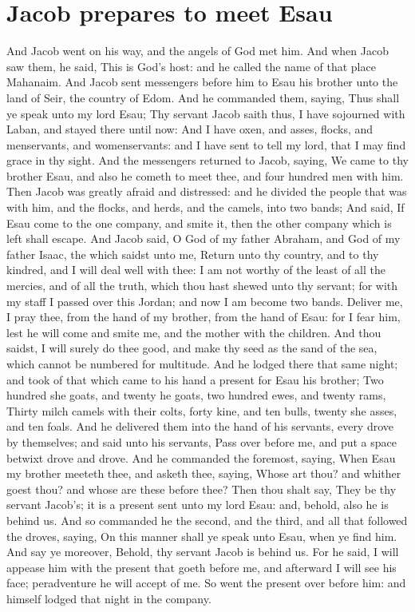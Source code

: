 \section*{Jacob prepares to meet Esau}
\begin{biblechapter} %
\verse And Jacob went on his way, and the angels of God met him.
\verse And when Jacob saw them, he said, This is God's host: and he called the name of that place Mahanaim.
\verse And Jacob sent messengers before him to Esau his brother unto the land of Seir, the country of Edom.
\verse And he commanded them, saying, Thus shall ye speak unto my lord Esau; Thy servant Jacob saith thus, I have sojourned with Laban, and stayed there until now:
\verse And I have oxen, and asses, flocks, and menservants, and womenservants: and I have sent to tell my lord, that I may find grace in thy sight.
\verse And the messengers returned to Jacob, saying, We came to thy brother Esau, and also he cometh to meet thee, and four hundred men with him.
\verse Then Jacob was greatly afraid and distressed: and he divided the people that was with him, and the flocks, and herds, and the camels, into two bands;
\verse And said, If Esau come to the one company, and smite it, then the other company which is left shall escape.
\verse And Jacob said, O God of my father Abraham, and God of my father Isaac, the \LORD which saidst unto me, Return unto thy country, and to thy kindred, and I will deal well with thee:
\verse I am not worthy of the least of all the mercies, and of all the truth, which thou hast shewed unto thy servant; for with my staff I passed over this Jordan; and now I am become two bands.
\verse Deliver me, I pray thee, from the hand of my brother, from the hand of Esau: for I fear him, lest he will come and smite me, and the mother with the children.
\verse And thou saidst, I will surely do thee good, and make thy seed as the sand of the sea, which cannot be numbered for multitude.
\verse And he lodged there that same night; and took of that which came to his hand a present for Esau his brother;
\verse Two hundred she goats, and twenty he goats, two hundred ewes, and twenty rams,
\verse Thirty milch camels with their colts, forty kine, and ten bulls, twenty she asses, and ten foals.
\verse And he delivered them into the hand of his servants, every drove by themselves; and said unto his servants, Pass over before me, and put a space betwixt drove and drove.
\verse And he commanded the foremost, saying, When Esau my brother meeteth thee, and asketh thee, saying, Whose art thou? and whither goest thou? and whose are these before thee?
\verse Then thou shalt say, They be thy servant Jacob's; it is a present sent unto my lord Esau: and, behold, also he is behind us.
\verse And so commanded he the second, and the third, and all that followed the droves, saying, On this manner shall ye speak unto Esau, when ye find him.
\verse And say ye moreover, Behold, thy servant Jacob is behind us. For he said, I will appease him with the present that goeth before me, and afterward I will see his face; peradventure he will accept of me.
\verse So went the present over before him: and himself lodged that night in the company.
\columnbreak %

\end{biblechapter}
